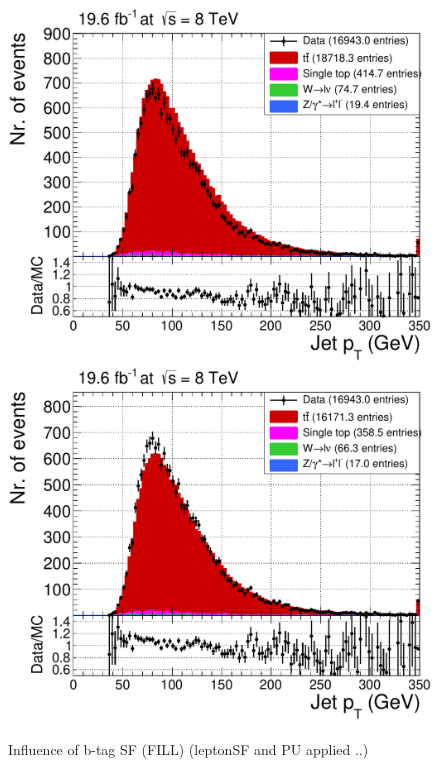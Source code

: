 \begin{figure}[h!t]
 \centering
 \includegraphics[width = 0.45 \textwidth]{Chapters/Chapter4_EvtSel/Figures/JetPt_LeadingJet_AllCuts_noBTagSF_mu_Stack.pdf}
 \includegraphics[width = 0.45 \textwidth]{Chapters/Chapter4_EvtSel/Figures/JetPt_LeadingJet_AllCuts_mu_Stack.pdf}
 \caption{Influence of b-tag SF (FILL) (leptonSF and PU applied ..)} \label{fig::BTagInfl}
\end{figure}






